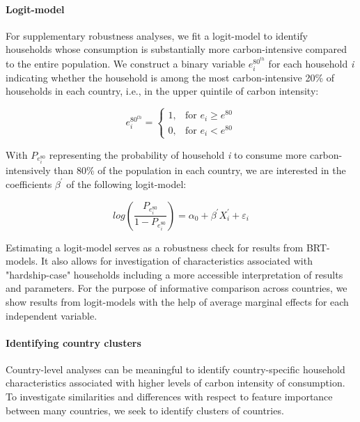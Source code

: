 \documentclass[12pt, a4paper]{article}
\begin{document}
\paragraph{Logit-model} For supplementary robustness analyses, we fit a logit-model to identify households whose consumption is substantially more carbon-intensive compared to the entire population. We construct a binary variable $e_{i}^{80^{th}}$ for each household \textit{i} indicating whether the household is among the most carbon-intensive 20\% of households in each country, i.e., in the upper quintile of carbon intensity:

\begin{equation}\label{eq:logit}
    e_{i}^{80^{th}} =
    \begin{cases}
    1, & \text{for }  e_{i} \geq e^{80} \\
    0, & \text{for }  e_{i} < e^{80}
    \end{cases}
\end{equation}

With $P_{e_{i}^{80}}$ representing the probability of household \textit{i} to consume more carbon-intensively than 80\% of the population in each country, we are interested in the coefficients $\beta^{'}$ of the following logit-model:

\begin{equation} \label{logit}
    log \left( \frac{P_{e_{i}^{80}}}{1 - P_{e_{i}^{80}}} \right) = \alpha_{0} + \beta^{'} X_{i}^{'} + \varepsilon_{i}
\end{equation}

Estimating a logit-model serves as a robustness check for results from BRT-models. It also allows for investigation of characteristics associated with "hardship-case" households including a more accessible interpretation of results and parameters. For the purpose of informative comparison across countries, we show results from logit-models with the help of average marginal effects for each independent variable.

\paragraph{Identifying country clusters} Country-level analyses can be meaningful to identify country-specific household characteristics associated with higher levels of carbon intensity of consumption. To investigate similarities and differences with respect to feature importance between many countries, we seek to identify clusters of countries. 
\end{document}
